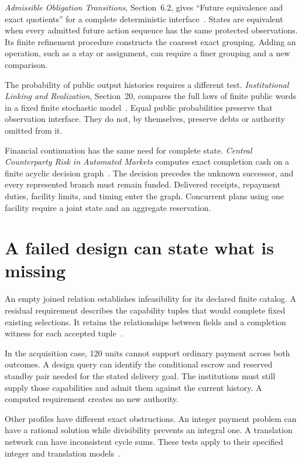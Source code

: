 \documentclass{momentum}
\begin{document}
\emph{Admissible Obligation Transitions}, Section~6.2, gives ``Future equivalence and exact quotients'' for a complete deterministic interface~\cite{transitions}.
States are equivalent when every admitted future action sequence has the same protected observations.
Its finite refinement procedure constructs the coarsest exact grouping.
Adding an operation, such as a stay or assignment, can require a finer grouping and a new comparison.

The probability of public output histories requires a different test.
\emph{Institutional Linking and Realization}, Section~20, compares the full laws of finite public words in a fixed finite stochastic model~\cite{linking}.
Equal public probabilities preserve that observation interface.
They do not, by themselves, preserve debts or authority omitted from it.

Financial continuation has the same need for complete state.
\emph{Central Counterparty Risk in Automated Markets} computes exact completion cash on a finite acyclic decision graph~\cite{risk}.
The decision precedes the unknown successor, and every represented branch must remain funded.
Delivered receipts, repayment duties, facility limits, and timing enter the graph.
Concurrent plans using one facility require a joint state and an aggregate reservation.

\section{A failed design can state what is missing}
\label{sec:obstructions}

An empty joined relation establishes infeasibility for its declared finite catalog.
A residual requirement describes the capability tuples that would complete fixed existing selections.
It retains the relationships between fields and a completion witness for each accepted tuple~\cite[Section~10]{linking}.

In the acquisition case, 120 units cannot support ordinary payment across both outcomes.
A design query can identify the conditional escrow and reserved standby pair needed for the stated delivery goal.
The institutions must still supply those capabilities and admit them against the current history.
A computed requirement creates no new authority.

Other profiles have different exact obstructions.
An integer payment problem can have a rational solution while divisibility prevents an integral one.
A translation network can have inconsistent cycle sums.
These tests apply to their specified integer and translation models~\cite[Sections~13--14]{linking}.
\end{document}
